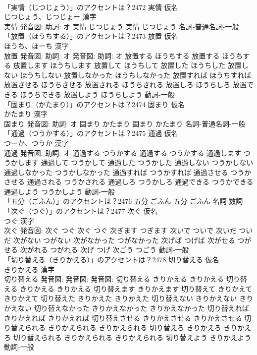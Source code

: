 \documentclass[8pt]{extreport}
\begin{document}
\begin{CJK}{UTF8}{min}
\\	「実情（じつじょう）」のアクセントは？2472	実情 仮名　
\\	じつじょう、じつじょー 漢字　
\\	実情 発音図: 助詞: オ	実情 じつじょう		実情 じつじょう				名詞-普通名詞-一般 
\\	「放置（ほうちする）」のアクセントは？2473	放置 仮名　
\\	ほうち、ほーち 漢字　
\\	放置 発音図: 助詞: オ 発音図: 助詞: オ	放置する ほうちする		放置する ほうちする 放置します ほうちします 放置して ほうちして 放置した ほうちした 放置しない ほうちしない 放置しなかった ほうちしなかった 放置すれば ほうちすれば 放置させる ほうちさせる 放置される ほうちされる 放置しろ ほうちしろ 放置できる ほうちできる 放置しよう ほうちしよう				動詞-一般 
\\	「固まり（かたまり）」のアクセントは？2474	固まり 仮名　
\\	かたまり 漢字　
\\	固まり 発音図: 助詞: オ	固まり かたまり		固まり かたまり				名詞-普通名詞-一般 
\\	「通過（つうかする）」のアクセントは？2475	通過 仮名　
\\	つーか、つうか 漢字　
\\	通過 発音図: 助詞: オ	通過する つうかする		通過する つうかする 通過します つうかします 通過して つうかして 通過した つうかした 通過しない つうかしない 通過しなかった つうかしなかった 通過すれば つうかすれば 通過させる つうかさせる 通過される つうかされる 通過しろ つうかしろ 通過できる つうかできる 通過しよう つうかしよう				動詞-一般 
\\	「五分（ごふん）」のアクセントは？2476		五分 ごふん		五分 ごふん				名詞-数詞 
\\	「次ぐ（つぐ）」のアクセントは？2477	次ぐ 仮名　
\\	つぐ 漢字　
\\	次ぐ 発音図:	次ぐ つぐ		次ぐ つぐ 次ぎます つぎます 次いで ついで 次いだ ついだ 次がない つがない 次がなかった つがなかった 次げば つげば 次がせる つがせる 次がれる つがれる 次げ つげ 次ごう つごう				動詞-一般 
\\	「切り替える（きりかえる）」のアクセントは？2478	切り替える 仮名　
\\	きりかえる 漢字　
\\	切り替える 発音図: 発音図: 発音図:	切り替える きりかえる きりかえる		切り替える きりかえる きりかえる 切り替えます きりかえます 切り替えて きりかえて きりかえて 切り替えた きりかえた きりかえた 切り替えない きりかえない きりかえない 切り替えなかった きりかえなかった きりかえなかった 切り替えれば きりかえれば きりかえれば 切り替えさせる きりかえさせる きりかえさせる 切り替えられる きりかえられる きりかえられる 切り替えろ きりかえろ きりかえろ 切り替えられる きりかえられる きりかえられる 切り替えよう きりかえよう				動詞-一般 

\end{CJK}
\end{document}
